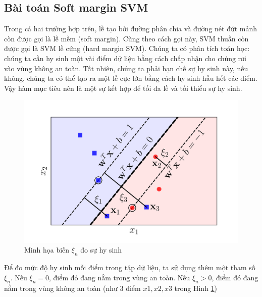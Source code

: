 \documentclass[a4paper, 12pt, oneside]{report}
\begin{document}
 \subsection{Bài toán Soft margin SVM}
 Trong cả hai trường hợp trên, lề tạo bởi đường phân chia và đường nét đứt mảnh còn được gọi là lề mềm (soft margin). Cũng theo cách gọi này, SVM thuần còn được gọi là SVM lề cứng (hard margin SVM). Chúng ta có phân tích toán học: chúng ta cần hy sinh một vài điểm dữ liệu bằng cách chấp nhận cho chúng rơi vào vùng không an toàn. Tất nhiên, chúng ta phải hạn chế sự hy sinh này, nếu không, chúng ta có thể tạo ra một lề cực lớn bằng cách hy sinh hầu hết các điểm. Vậy hàm mục tiêu nên là một sự kết hợp để tối đa lề và tối thiểu sự hy sinh.
 \begin{center}
    \begin{figure}[H]
    \begin{center}
     \includegraphics[scale=0.08]{ssvm3.png}
    \end{center}
    \caption{Minh họa biến $\xi_n$ đo sự hy sinh}
    \label{hình 2.5}
    \end{figure}
\end{center}
Để đo mức độ hy sinh mỗi điểm trong tập dữ liệu, ta sử dụng thêm một tham số $\xi_n$. Nếu $\xi_n = 0$, điểm đó đang nằm trong vùng an toàn. Nếu $\xi_n >0$, điểm đó đang nằm trong vùng không an toàn (như 3 điểm $x1,x2,x3$ trong Hình \ref{hình 2.5}) 
\end{document}
